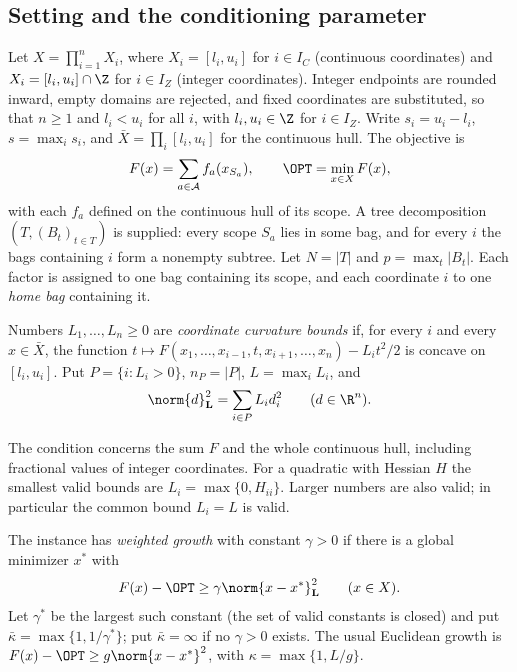 
\subsection{Setting and the conditioning parameter}\label{core:sec:setting}

Let $X=\prod_{i=1}^nX_i$, where $X_i=[l_i,u_i]$ for $i\in I_C$ (continuous
coordinates) and $X_i=[l_i,u_i]\cap\Z$ for $i\in I_Z$ (integer coordinates).
Integer endpoints are rounded inward, empty domains are rejected, and fixed
coordinates are substituted, so that $n\ge1$ and $l_i<u_i$ for all $i$, with
$l_i,u_i\in\Z$ for $i\in I_Z$. Write $s_i=u_i-l_i$, $s=\max_is_i$, and
$\bar X=\prod_i[l_i,u_i]$ for the continuous hull. The objective is
\[
F(x)=\sum_{a\in\mathcal A}f_a(x_{S_a}),\qquad \OPT=\min_{x\in X}F(x),
\]
with each $f_a$ defined on the continuous hull of its scope. A tree
decomposition $(T,(B_t)_{t\in T})$ is supplied: every scope $S_a$ lies in
some bag, and for every $i$ the bags containing $i$ form a nonempty subtree.
Let $N=|T|$ and $p=\max_t|B_t|$. Each factor is assigned to one bag containing
its scope, and each coordinate $i$ to one \emph{home bag} containing it.

\begin{definition}\label{core:def:curv}
Numbers $L_1,\dots,L_n\ge0$ are \emph{coordinate curvature bounds} if, for
every $i$ and every $x\in\bar X$, the function
$t\mapsto F(x_1,\dots,x_{i-1},t,x_{i+1},\dots,x_n)-L_it^2/2$ is concave on
$[l_i,u_i]$. Put $P=\{i:L_i>0\}$, $n_P=|P|$, $L=\max_iL_i$, and
\[
\norm{d}_{\mathbf L}^2=\sum_{i\in P}L_id_i^2\qquad(d\in\R^n).
\]
\end{definition}

The condition concerns the sum $F$ and the whole continuous hull, including
fractional values of integer coordinates. For a quadratic with Hessian $H$ the
smallest valid bounds are $L_i=\max\{0,H_{ii}\}$. Larger numbers are also
valid; in particular the common bound $L_i=L$ is valid.

\begin{definition}\label{core:def:growth}
The instance has \emph{weighted growth} with constant $\gamma>0$ if there is
a global minimizer $x^*$ with
\begin{equation}\label{core:eq:growth}
F(x)-\OPT\ge\gamma\norm{x-x^*}_{\mathbf L}^2\qquad(x\in X).
\end{equation}
Let $\gamma^*$ be the largest such constant (the set of valid constants is
closed) and put $\bar\kappa=\max\{1,1/\gamma^*\}$; put $\bar\kappa=\infty$ if
no $\gamma>0$ exists. The usual Euclidean growth is
$F(x)-\OPT\ge g\norm{x-x^*}^2$, with $\kappa=\max\{1,L/g\}$.
\end{definition}

